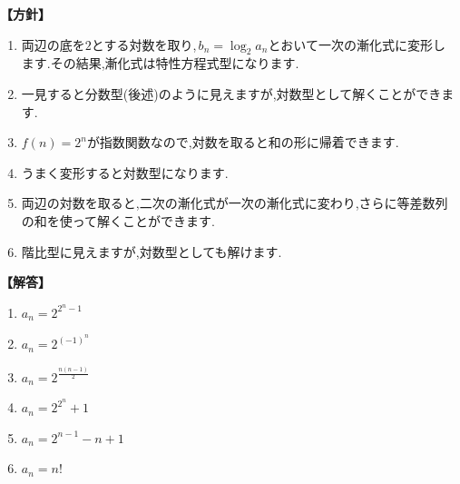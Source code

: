   \noindent\textbf{【方針】}
  \begin{enumerate}[label=(\arabic*),parsep=3pt]
    \item 両辺の底を$2$とする対数を取り,\,$b_n=\log_2a_n$とおいて一次の漸化式に変形します.その結果,漸化式は特性方程式型になります.
    \item 一見すると分数型(後述)のように見えますが,対数型として解くことができます.
    \item $f(n)=2^n$が指数関数なので,対数を取ると和の形に帰着できます.
    \item うまく変形すると対数型になります.
    \item 両辺の対数を取ると,二次の漸化式が一次の漸化式に変わり,さらに等差数列の和を使って解くことができます.
    \item 階比型に見えますが,対数型としても解けます.
  \end{enumerate}

  \noindent\textbf{【解答】}
  \begin{enumerate}[label=(\arabic*),parsep=3pt]
    \item $\displaystyle a_n=2^{2^{n}-1}$
    \item $a_n=2^{(-1)^{n}}$
    \item $a_n=2^{\frac{n(n-1)}{2}}$
    \item $a_n=2^{2^n}+1$
    \item $\displaystyle a_n=2^{n-1}-n+1$
    \item $a_n=n!$
  \end{enumerate}


